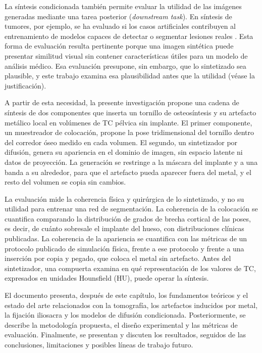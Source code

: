 La síntesis condicionada también permite evaluar la utilidad de las imágenes generadas mediante una tarea posterior (\textit{downstream task}). En síntesis de tumores, por ejemplo, se ha evaluado si los casos artificiales contribuyen al entrenamiento de modelos capaces de detectar o segmentar lesiones reales \cite{chen2024tumorsynthesis}. Esta forma de evaluación resulta pertinente porque una imagen sintética puede presentar similitud visual sin contener características útiles para un modelo de análisis médico. Esa evaluación presupone, sin embargo, que lo sintetizado sea plausible, y este trabajo examina esa plausibilidad antes que la utilidad (véase la justificación).

A partir de esta necesidad, la presente investigación propone una cadena de síntesis de dos componentes que inserta un tornillo de osteosíntesis y su artefacto metálico local en volúmenes de TC pélvica sin implante. El primer componente, un muestreador de colocación, propone la pose tridimensional del tornillo dentro del corredor óseo medido en cada volumen. El segundo, un sintetizador por difusión, genera su apariencia en el dominio de imagen, sin espacio latente ni datos de proyección. La generación se restringe a la máscara del implante y a una banda a su alrededor, para que el artefacto pueda aparecer fuera del metal, y el resto del volumen se copia sin cambios.

La evaluación mide la coherencia física y quirúrgica de lo sintetizado, y no su utilidad para entrenar una red de segmentación. La coherencia de la colocación se cuantifica comparando la distribución de grados de brecha cortical de las poses, es decir, de cuánto sobresale el implante del hueso, con distribuciones clínicas publicadas. La coherencia de la apariencia se cuantifica con las métricas de un protocolo publicado de simulación física, frente a ese protocolo y frente a una inserción por copia y pegado, que coloca el metal sin artefacto. Antes del sintetizador, una compuerta examina en qué representación de los valores de TC, expresados en unidades Hounsfield (HU), puede operar la síntesis.

El documento presenta, después de este capítulo, los fundamentos teóricos y el estado del arte relacionados con la tomografía, los artefactos inducidos por metal, la fijación iliosacra y los modelos de difusión condicionada. Posteriormente, se describe la metodología propuesta, el diseño experimental y las métricas de evaluación. Finalmente, se presentan y discuten los resultados, seguidos de las conclusiones, limitaciones y posibles líneas de trabajo futuro.


